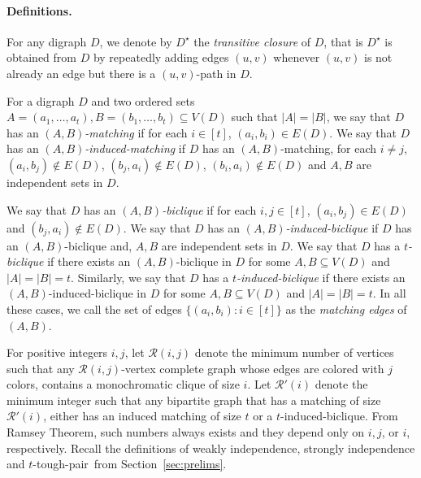 \documentclass[a4paper,11pt]{article}
\theoremstyle{plain}
\newtheorem{identification rule}{Identification Rule}
\theoremstyle{definition}
\theoremstyle{remark}
\newcommand{\toughpair}{tough-pair}
\begin{document}
\paragraph*{Definitions.}

 For any digraph $D$, we denote by $D^{\star}$ the {\em transitive closure} of $D$, that is $D^{\star}$ is obtained from $D$ by repeatedly adding edges $(u,v)$ whenever $(u,v)$ is not already an edge but there is a $(u,v)$-path in $D$.

For a digraph $D$ and two ordered sets $A =(a_1,\ldots, a_t),B=(b_1, \ldots,b_t) \subseteq V(D)$ such that $|A|=|B|$, we say that $D$ has an {\em $(A,B)$-matching} if for each $i \in [t]$, $(a_i,b_i) \in E(D)$. We say that $D$ has an {\em $(A,B)$-induced-matching} if $D$ has an $(A,B)$-matching, for each $i \neq j$, $(a_i,b_j) \not \in E(D)$, $(b_j,a_i) \not \in E(D)$, $(b_i,a_i) \not \in E(D)$ and $A,B$  are independent sets in $D$.

We say that $D$ has an {\em $(A,B)$-biclique} if for each $i,j \in [t]$, $(a_i,b_j) \in E(D)$ and $(b_j,a_i) \not \in E(D)$. We say that $D$ has an {\em $(A,B)$-induced-biclique}
if $D$ has an $(A,B)$-biclique and, $A, B$ are independent sets in $D$. We say that $D$ has a {\em $t$-biclique} if there exists an $(A,B)$-biclique in $D$ for some $A,B \subseteq V(D)$ and $|A|=|B|=t$. Similarly, we say that $D$ has a {\em $t$-induced-biclique} if there exists an $(A,B)$-induced-biclique in $D$ for some $A,B \subseteq V(D)$ and $|A|=|B|=t$. In all these cases, we call the set of edges $\{(a_i,b_i): i \in [t]\}$ as the {\em matching edges} of $(A,B)$.

For positive integers $i,j$, let $\mathcal{R}(i,j)$ denote the minimum number of vertices such that any $\mathcal{R}(i,j)$-vertex complete graph whose edges are colored with $j$ colors, contains a monochromatic clique of size $i$. Let $\mathcal{R}'(i)$ denote the minimum integer such that any bipartite graph that has a matching of size $\mathcal{R}'(i)$, either has an induced matching of size $t$ or a $t$-induced-biclique.
From Ramsey Theorem, such numbers always exists and they depend only on $i,j$, or $i$, respectively.
Recall the definitions of weakly independence, strongly independence and $t$-\toughpair\ from Section~\ref{sec:prelims}.
\end{document}
